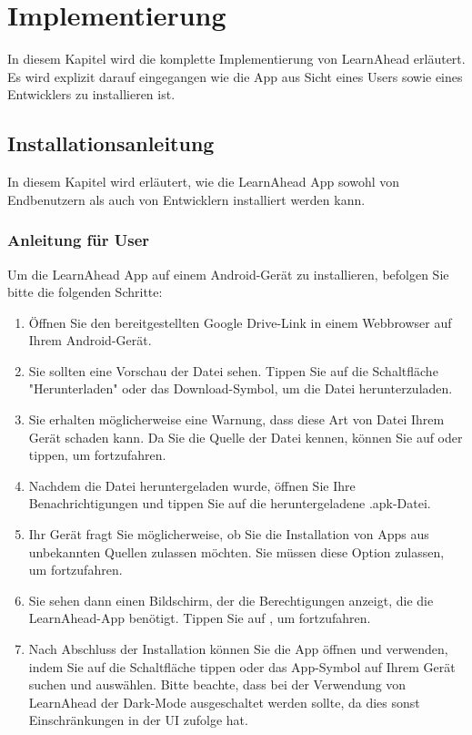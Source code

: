 \section{Implementierung}
In diesem Kapitel wird die komplette Implementierung von LearnAhead erläutert. Es wird explizit darauf eingegangen wie die App aus Sicht eines Users sowie eines Entwicklers zu installieren ist.\newline

\subsection{Installationsanleitung}
In diesem Kapitel wird erläutert, wie die LearnAhead App sowohl von Endbenutzern als auch von Entwicklern installiert werden kann.
\subsubsection{Anleitung für User}
Um die LearnAhead App auf einem Android-Gerät zu installieren, befolgen Sie bitte die folgenden Schritte: \newline

\noindent
\begin{enumerate}
    \item Öffnen Sie den bereitgestellten Google Drive-Link in einem Webbrowser auf Ihrem Android-Gerät.
    \item Sie sollten eine Vorschau der Datei  sehen. Tippen Sie auf die Schaltfläche "Herunterladen" oder das Download-Symbol, um die Datei herunterzuladen.
    \item Sie erhalten möglicherweise eine Warnung, dass diese Art von Datei Ihrem Gerät schaden kann. Da Sie die Quelle der Datei kennen, können Sie auf  oder  tippen, um fortzufahren.
    \item Nachdem die Datei heruntergeladen wurde, öffnen Sie Ihre Benachrichtigungen und tippen Sie auf die heruntergeladene .apk-Datei.
    \item Ihr Gerät fragt Sie möglicherweise, ob Sie die Installation von Apps aus unbekannten Quellen zulassen möchten. Sie müssen diese Option zulassen, um fortzufahren.
    \item Sie sehen dann einen Bildschirm, der die Berechtigungen anzeigt, die die LearnAhead-App benötigt. Tippen Sie auf , um fortzufahren.
    \item Nach Abschluss der Installation können Sie die App öffnen und verwenden, indem Sie auf die Schaltfläche  tippen oder das App-Symbol auf Ihrem Gerät suchen und auswählen. Bitte beachte, dass bei der Verwendung von LearnAhead der Dark-Mode ausgeschaltet werden sollte, da dies sonst Einschränkungen in der UI zufolge hat.
\end{enumerate}

